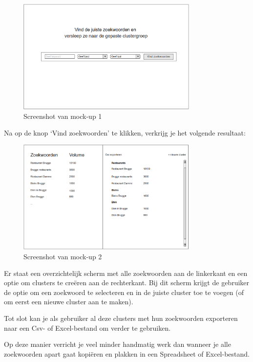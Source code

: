 \begin{figure}[h!]
\centering
\includegraphics[width=0.8\textwidth]{img/Mockup.png}
\caption{Screenshot van mock-up 1}
\end{figure}

Na op de knop ‘Vind zoekwoorden’ te klikken, verkrijg je het volgende resultaat: 

\begin{figure}[h!]
\centering
\includegraphics[width=0.8\textwidth]{img/Mockup2.png}
\caption{Screenshot van mock-up 2}
\end{figure}

Er staat een overzichtelijk scherm met alle zoekwoorden aan de linkerkant en een optie om clusters te creëren aan de rechterkant. Bij dit scherm krijgt de gebruiker de optie om een zoekwoord te selecteren en in de juiste cluster toe te voegen (of om eerst een nieuwe cluster aan te maken). 

Tot slot kan je als gebruiker al deze clusters met hun zoekwoorden exporteren naar een Csv- of Excel-bestand om verder te gebruiken. 

Op deze manier verricht je veel minder handmatig werk dan wanneer je alle zoekwoorden apart gaat kopiëren en plakken in een Spreadsheet of Excel-bestand. 

